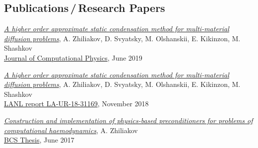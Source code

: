 \documentclass[a4paper,12pt]{article}
\begin{document}
	\subsection*{Publications\,/\,Research Papers}
	
	\begin{etaremune}[topsep=0pt]
		\item \textit{\href{https://www.researchgate.net/publication/333900759_A_higher_order_approximate_static_condensation_method_for_multi-material_diffusion_problems}{A higher order approximate static condensation method for multi-material diffusion problems}}, A. Zhiliakov, D. Svyatsky, M. Olshanskii, E. Kikinzon, M. Shashkov\\ \href{https://authors.elsevier.com/c/1ZIL6508HiGTG}{Journal of Computational Physics}, June 2019 
		\item \textit{\href{https://www.researchgate.net/publication/329327346_A_higher_order_approximate_static_condensation_method_for_multi-material_diffusion_problems}{A higher order approximate static condensation method for multi-material diffusion problems}}, A. Zhiliakov, D. Svyatsky, M. Olshanskii, E. Kikinzon, M. Shashkov\\ \href{https://permalink.lanl.gov/object/tr?what=info:lanl-repo/lareport/LA-UR-18-31169}{LANL report LA-UR-18-31169}, November 2018 
		\item \textit{\href{https://www.researchgate.net/publication/318039077_Postroenie_i_realizacia_fiziceskih_pereobuslavlivatelej_dla_zadac_vycislitelnoj_gemodinamiki}{Construction and implementation of physics-based preconditioners for problems of computational haemodynamics}}, A. Zhiliakov\\ \href{https://elibrary.nstu.ru/source?id=61216}{BCS Thesis}, June 2017   
%			
%			
	\end{etaremune}
\end{document}
